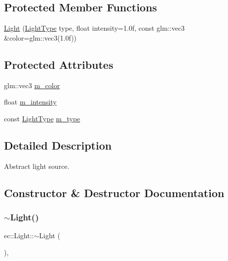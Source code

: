 \subsection*{Protected Member Functions}
\begin{DoxyCompactItemize}
\item 
\mbox{\hyperlink{classec_1_1_light_a7816fc3b8f92cd0ac732be6944754995}{Light}} (\mbox{\hyperlink{namespaceec_a30e2a743ebdeb02ac68a6cfa50f629c7}{Light\+Type}} type, float intensity=1.\+0f, const glm\+::vec3 \&color=glm\+::vec3(1.\+0f))
\end{DoxyCompactItemize}
\subsection*{Protected Attributes}
\begin{DoxyCompactItemize}
\item 
glm\+::vec3 \mbox{\hyperlink{classec_1_1_light_a7dfc41f1e8f2d7ddad97d60c610c302e}{m\+\_\+color}}
\item 
float \mbox{\hyperlink{classec_1_1_light_ac655cc4148d5aa4d052bace97770f3b1}{m\+\_\+intensity}}
\item 
const \mbox{\hyperlink{namespaceec_a30e2a743ebdeb02ac68a6cfa50f629c7}{Light\+Type}} \mbox{\hyperlink{classec_1_1_light_ae3d04075982c6c62e7687b214a504c30}{m\+\_\+type}}
\end{DoxyCompactItemize}


\subsection{Detailed Description}
Abstract light source. 

\subsection{Constructor \& Destructor Documentation}
\mbox{\label{classec_1_1_light_af9024a28fff2403705d1a6e9cad4a128}} 
\subsubsection{\texorpdfstring{$\sim$\+Light()}{~Light()}}
{\footnotesize\ttfamily ec\+::\+Light\+::$\sim$\+Light (\begin{DoxyParamCaption}{ }\end{DoxyParamCaption})\hspace{0.3cm}{\ttfamily [virtual]}, {\ttfamily [default]}}

